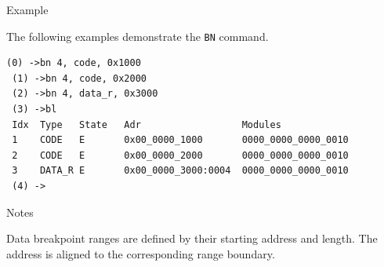 \begin{iPageDescEntry}{Example}

The following examples demonstrate the \texttt{BN} command. 

\begin{lstlisting}[style=iPageOpStyle]
 (0) ->bn 4, code, 0x1000
 (1) ->bn 4, code, 0x2000
 (2) ->bn 4, data_r, 0x3000
 (3) ->bl
 Idx  Type   State   Adr                  Modules         
 1    CODE   E       0x00_0000_1000       0000_0000_0000_0010
 2    CODE   E       0x00_0000_2000       0000_0000_0000_0010
 3    DATA_R E       0x00_0000_3000:0004  0000_0000_0000_0010
 (4) ->
\end{lstlisting}
\end{iPageDescEntry}

\begin{iPageDescEntry}{Notes}

Data breakpoint ranges are defined by their starting address and
length. The address is aligned to the corresponding range boundary.

\end{iPageDescEntry}